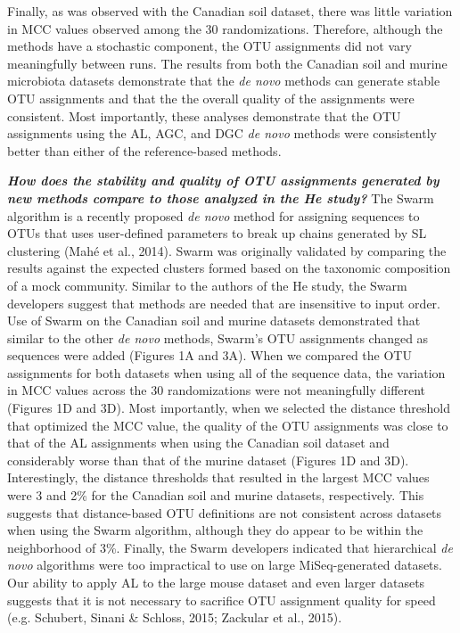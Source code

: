 \documentclass[11pt,]{article}
\begin{document}
Finally, as was observed with the Canadian soil dataset, there was
little variation in MCC values observed among the 30 randomizations.
Therefore, although the methods have a stochastic component, the OTU
assignments did not vary meaningfully between runs. The results from
both the Canadian soil and murine microbiota datasets demonstrate that
the \emph{de novo} methods can generate stable OTU assignments and that
the the overall quality of the assignments were consistent. Most
importantly, these analyses demonstrate that the OTU assignments using
the AL, AGC, and DGC \emph{de novo} methods were consistently better
than either of the reference-based methods.

\textbf{\emph{How does the stability and quality of OTU assignments
generated by new methods compare to those analyzed in the He study?}}
The Swarm algorithm is a recently proposed \emph{de novo} method for
assigning sequences to OTUs that uses user-defined parameters to break
up chains generated by SL clustering (Mahé et al., 2014). Swarm was
originally validated by comparing the results against the expected
clusters formed based on the taxonomic composition of a mock community.
Similar to the authors of the He study, the Swarm developers suggest
that methods are needed that are insensitive to input order. Use of
Swarm on the Canadian soil and murine datasets demonstrated that similar
to the other \emph{de novo} methods, Swarm's OTU assignments changed as
sequences were added (Figures 1A and 3A). When we compared the OTU
assignments for both datasets when using all of the sequence data, the
variation in MCC values across the 30 randomizations were not
meaningfully different (Figures 1D and 3D). Most importantly, when we
selected the distance threshold that optimized the MCC value, the
quality of the OTU assignments was close to that of the AL assignments
when using the Canadian soil dataset and considerably worse than that of
the murine dataset (Figures 1D and 3D). Interestingly, the distance
thresholds that resulted in the largest MCC values were 3 and 2\% for
the Canadian soil and murine datasets, respectively. This suggests that
distance-based OTU definitions are not consistent across datasets when
using the Swarm algorithm, although they do appear to be within the
neighborhood of 3\%. Finally, the Swarm developers indicated that
hierarchical \emph{de novo} algorithms were too impractical to use on
large MiSeq-generated datasets. Our ability to apply AL to the large
mouse dataset and even larger datasets suggests that it is not necessary
to sacrifice OTU assignment quality for speed (e.g. Schubert, Sinani \&
Schloss, 2015; Zackular et al., 2015).
\end{document}
